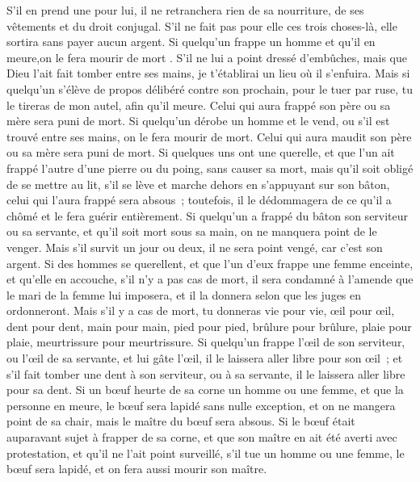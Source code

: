 \begin{multicols}{2}
S'il en prend une pour lui, il ne retranchera rien de sa nourriture, de ses vêtements et du droit conjugal.
S'il ne fait pas pour elle ces trois choses-là, elle sortira sans payer aucun argent.
Si quelqu'un frappe un homme et qu'il en meure,on le fera mourir de mort .
S'il ne lui a point dressé d'embûches, mais que Dieu l'ait fait tomber entre ses mains, je t'établirai un lieu où il s'enfuira.
Mais si quelqu'un s'élève de propos délibéré contre son prochain, pour le tuer par ruse, tu le tireras de mon autel, afin qu'il meure.
Celui qui aura frappé son père ou sa mère sera puni de mort.
Si quelqu'un dérobe un homme et le vend, ou s'il est trouvé entre ses mains, on le fera mourir de mort.
Celui qui aura maudit son père ou sa mère sera puni de mort.
Si quelques uns ont une querelle, et que l'un ait frappé l'autre d'une pierre ou du poing, sans causer sa mort, mais qu'il soit obligé de se mettre au lit,
s'il se lève et marche dehors en s'appuyant sur son bâton, celui qui l'aura frappé sera absous~; toutefois, il le dédommagera de ce qu'il a chômé et le fera guérir entièrement.
Si quelqu'un a frappé du bâton son serviteur ou sa servante, et qu'il soit mort sous sa main, on ne manquera point de le venger.
Mais s'il survit un jour ou deux, il ne sera point vengé, car c'est son argent.
Si des hommes se querellent, et que l'un d'eux frappe une femme enceinte, et qu'elle en accouche, s'il n'y a pas cas de mort, il sera condamné à l'amende que le mari de la femme lui imposera, et il la donnera selon que les juges en ordonneront.
Mais s'il y a cas de mort, tu donneras vie pour vie,
œil pour œil, dent pour dent, main pour main, pied pour pied,
brûlure pour brûlure, plaie pour plaie, meurtrissure pour meurtrissure.
Si quelqu'un frappe l'œil de son serviteur, ou l'œil de sa servante, et lui gâte l'œil, il le laissera aller libre pour son œil~;
et s'il fait tomber une dent à son serviteur, ou à sa servante, il le laissera aller libre pour sa dent.
Si un bœuf heurte de sa corne un homme ou une femme, et que la personne en meure, le bœuf sera lapidé sans nulle exception, et on ne mangera point de sa chair, mais le maître du bœuf sera absous.
Si le bœuf était auparavant sujet à frapper de sa corne, et que son maître en ait été averti avec protestation, et qu'il ne l'ait point surveillé, s'il tue un homme ou une femme, le bœuf sera lapidé, et on fera aussi mourir son maître.

\end{multicols}
